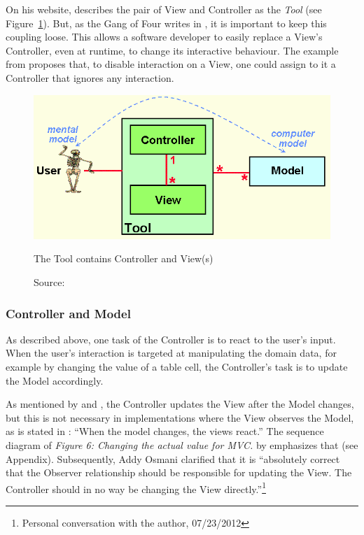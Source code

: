 On his website,  describes the pair of View and Controller as the \emph{Tool} (see Figure~\ref{fig:tool}). But, as the Gang of Four writes in , it is important to keep this coupling loose. This allows a software developer to easily replace a View's Controller, even at runtime, to change its interactive behaviour. The example from  proposes that, to disable interaction on a View, one could assign to it a Controller that ignores any interaction.
\begin{figure}[H]
	\centering
	\includegraphics[width=12cm]{images/MVC-2006.png}
	\caption{The Tool contains Controller and View(s)}
	\caption*{Source: }
	\label{fig:tool}
\end{figure}

\subsubsection{Controller and Model}
As described above, one task of the Controller is to react to the user's input. When the user's interaction is targeted at manipulating the domain data, for example by changing the value of a table cell, the Controller's task is to update the Model accordingly.

As mentioned by  and , the Controller updates the View after the Model changes, but this is not necessary in implementations where the View observes the Model, as is stated in : ``When the model changes, the views react.'' The sequence diagram of \emph{Figure 6: Changing the actual value for MVC.} by  emphasizes that (see Appendix). Subsequently, Addy Osmani clarified that it is ``absolutely correct that the Observer relationship should be responsible for updating the View. The Controller should in no way be changing the View directly.''\footnote{Personal conversation with the author, 07/23/2012}

